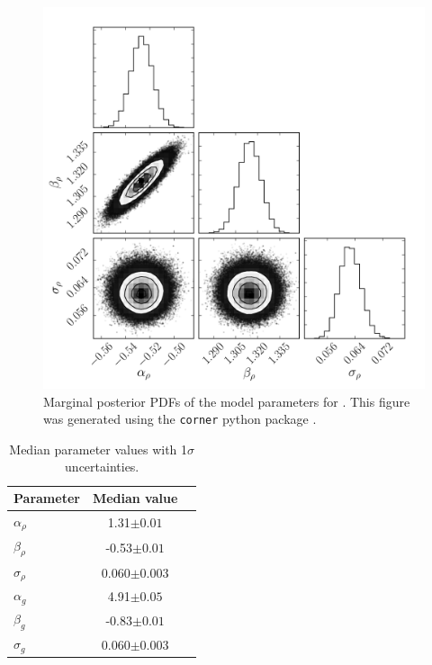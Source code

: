\begin{figure}
\begin{center}
\includegraphics[width=6in,angle=0,clip=true]{figures/rho_triangle.pdf}
\caption[Marginal posterior PDFs for flicker versus \rhostar parameters.]
{Marginal posterior PDFs of the model parameters for \rhostar.
This figure was generated using the {\tt corner} python package
\citep{Corner}.}
\label{fig:triangle}
\end{center}
\end{figure}

\begin{table}
\begin{center}
\caption[Flicker results.]
{Median parameter values with 1$\sigma$ uncertainties.}
\begin{tabular}{lcc}
\hline\hline
Parameter & Median value \\
    \hline
$\alpha_\rho$   &    1.31$\pm 0.01$   \\
$\beta_\rho$    &    -0.53$\pm 0.01$   \\
$\sigma_\rho$   &    0.060$\pm 0.003$   \\
\hline
$\alpha_g$      &    4.91$\pm 0.05$   \\
$\beta_g$       &   -0.83$\pm 0.01$   \\
$\sigma_g$      &    0.060$\pm 0.003$   \\
    \hline
\end{tabular}
\end{center}
\end{table}
\label{tab:results}

